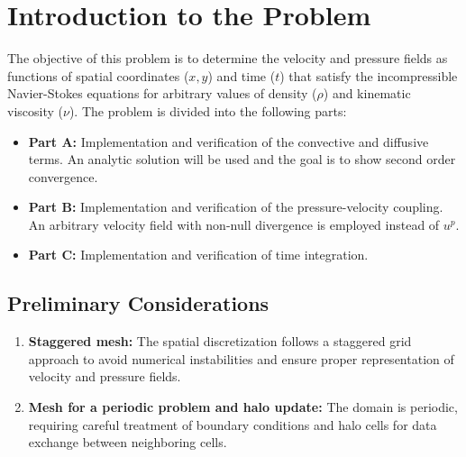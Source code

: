 \section{Introduction to the Problem}

The objective of this problem is to determine the velocity and pressure fields as functions of spatial coordinates ($x, y$) and time ($t$) that satisfy the incompressible Navier-Stokes equations for arbitrary values of density ($\rho$) and kinematic viscosity ($\nu$). The problem is divided into the following parts:
\begin{itemize}
    \item \textbf{Part A:} Implementation and verification of the convective and diffusive terms. An analytic solution will be used and the goal is to show second order convergence.
    
    \item \textbf{Part B:} Implementation and verification of the pressure-velocity coupling. An arbitrary velocity field with non-null divergence is employed instead of $u^p$.
    
    \item \textbf{Part C:} Implementation and verification of time integration.
\end{itemize}

\subsection{Preliminary Considerations}
\begin{enumerate}
    \item \textbf{Staggered mesh:} The spatial discretization follows a staggered grid approach to avoid numerical instabilities and ensure proper representation of velocity and pressure fields.
    \item \textbf{Mesh for a periodic problem and halo update:} The domain is periodic, requiring careful treatment of boundary conditions and halo cells for data exchange between neighboring cells.
\end{enumerate}

